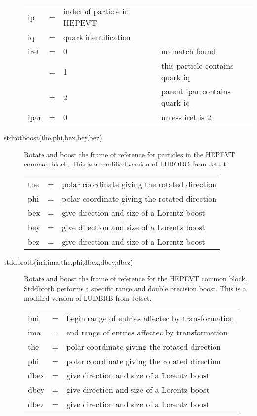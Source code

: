 \begin{description}
\begin{tabular}{lcll}
ip   & = & index of particle in HEPEVT \\
iq   & = & quark identification \\
iret & = & 0 & no match found \\
     & = & 1 & this particle contains quark iq \\
     & = & 2 & parent ipar contains quark iq \\
ipar & = & 0 & unless iret is 2 \\
\end{tabular}

\item[stdrotboost(the,phi,bex,bey,bez)]
 Rotate and boost the frame of reference for particles in the
 \mbox{HEPEVT} common block. 
 This is a modified version of LUROBO from Jetset.

\begin{tabular}{lcl}
the  & = & polar coordinate giving the rotated direction \\
phi  & = & polar coordinate giving the rotated direction \\
bex  & = & give direction and size of a Lorentz boost \\
bey  & = & give direction and size of a Lorentz boost \\
bez  & = & give direction and size of a Lorentz boost \\
\end{tabular}

\item[stddbrotb(imi,ima,the,phi,dbex,dbey,dbez)] 
 Rotate and boost the frame of reference for the HEPEVT common block. 
 Stddbrotb performs a specific range and double precision boost.
 This is a modified version of LUDBRB from Jetset.

\begin{tabular}{lcl}
imi  & = & begin range of entries affectec by transformation \\
ima  & = & end range of entries affectec by transformation \\
the  & = & polar coordinate giving the rotated direction \\
phi  & = & polar coordinate giving the rotated direction \\
dbex & = & give direction and size of a Lorentz boost \\
dbey & = & give direction and size of a Lorentz boost \\
dbez & = & give direction and size of a Lorentz boost \\
\end{tabular}


\end{description}
